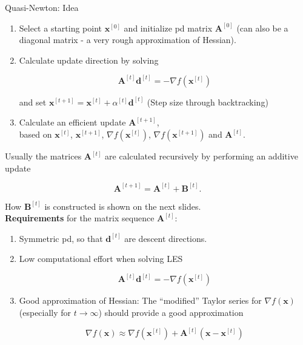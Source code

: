 \documentclass[11pt,compress,t,notes=noshow, xcolor=table]{beamer}
\begin{document}
\begin{vbframe}{Quasi-Newton: Idea}
\framebreak



\begin{enumerate}
\item Select a starting point $\mathbf{x}^{[0]}$ and initialize pd matrix
$\mathbf{A}^{[0]}$ (can also be a diagonal matrix - a very rough approximation of Hessian).
\item Calculate update direction by solving

$$
\bm{A}^{[t]} \bm{d}^{[t]} = - \nabla f(\mathbf{x}^{[t]})
$$

and set $\bm{x}^{[t+1]} = \bm{x}^{[t]} + \alpha^{[t]} \bm{d}^{[t]}$ (Step size through backtracking)
\item Calculate an efficient update $\mathbf{A}^{[t+1]}$,\\based on $\mathbf{x}^{[t]}$,
$\mathbf{x}^{[t+1]}$, $\nabla f(\mathbf{x}^{[t]})$, $\nabla f(\mathbf{x}^{[t+1]})$ and
$\mathbf{A}^{[t]}$.
\end{enumerate}

\framebreak

Usually the matrices $\bm{A}^{[t]}$ are calculated recursively by performing an additive update 

$$
\bm{A}^{[t+1]} = \bm{A}^{[t]} + \bm{B}^{[t]}. 
$$

How $ \bm{B}^{[t]}$ is constructed is shown on the next slides. \\
\textbf{Requirements} for the matrix sequence $\bm{A}^{[t]}$:
\begin{enumerate}
\item Symmetric pd, so that $\bm{d}^{[t]}$ are descent directions.
\item Low computational effort when solving LES

$$
\bm{A}^{[t]} \bm{d}^{[t]} = - \nabla f(\mathbf{x}^{[t]})
$$

\item Good approximation of Hessian: The \enquote{modified} Taylor series for $\nabla f(\bm{x})$ (especially for $t \to \infty$) should provide a good approximation

$$
\nabla f(\mathbf{x}) \approx \nabla f(\mathbf{x}^{[t]}) +
\bm{A}^{[t]}(\mathbf{x} - \mathbf{x}^{[t]})
$$
\end{enumerate}



\end{vbframe}
\end{document}
